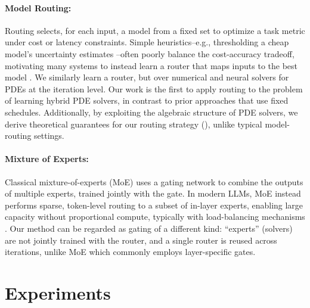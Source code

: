 \documentclass{article}
\begin{document}
\paragraph{Model Routing:} Routing \citep{shnitzer2023large,hu2024routerbench,ding2024hybrid,huang2025routereval} selects, for each input, a model from a fixed set to optimize a task metric under cost or latency constraints. Simple heuristics--e.g., thresholding a cheap model's uncertainty estimates \citep{chuang2024learning,chuang2025confident}--often poorly balance the cost-accuracy tradeoff, motivating many systems to instead learn a router that maps inputs to the best model \citep{hari2023tryage,mohammadshahi2024routoo,vsakota2024fly}. We similarly learn a router, but over numerical and neural solvers for PDEs at the iteration level. Our work is the first to apply routing to the problem of learning hybrid PDE solvers, in contrast to prior approaches that use fixed schedules. Additionally, by exploiting the algebraic structure of PDE solvers, we derive theoretical guarantees for our routing strategy (), unlike typical model-routing settings.

\paragraph{Mixture of Experts:} Classical mixture-of-experts (MoE) \citep{jacobs1991adaptive,jordan1994hierarchical} uses a gating network to combine the outputs of multiple experts, trained jointly with the gate. In modern LLMs, MoE instead performs sparse, token-level routing to a subset of in-layer experts, enabling large capacity without proportional compute, typically with load-balancing mechanisms \citep{shazeer2017outrageously,lepikhin2020gshard,fedus2022switch,jiang2024mixtral}. 
Our method can be regarded as gating of a different kind: ``experts'' (solvers) are not jointly trained with the router, and a single router is reused across iterations, unlike MoE which commonly employs layer-specific gates.

\section{Experiments}\label{sec:experiments}
\end{document}
